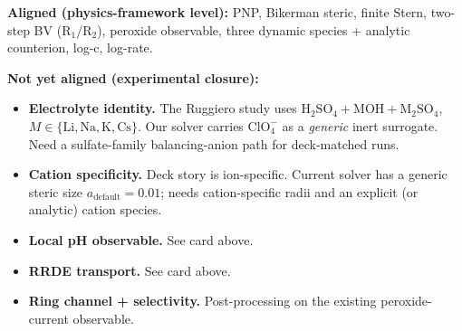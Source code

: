 \documentclass[11pt]{article}
\begin{document}
\begin{tcolorbox}[cardstyle={Where we are vs.\ deck experiment (closure list)}]
\textbf{Aligned (physics-framework level):} PNP, Bikerman steric,
finite Stern, two-step BV (R$_1$/R$_2$), peroxide observable, three
dynamic species + analytic counterion, log-c, log-rate.

\textbf{Not yet aligned (experimental closure):}

\begin{itemize}
  \item \textbf{Electrolyte identity.} The Ruggiero study uses
        \(\mathrm{H_2SO_4 + MOH + M_2SO_4}\),
        \(M\in\{\mathrm{Li,Na,K,Cs}\}\). Our solver carries
        \(\mathrm{ClO_4^-}\) as a \emph{generic} inert surrogate.
        Need a sulfate-family balancing-anion path for deck-matched runs.
  \item \textbf{Cation specificity.} Deck story is ion-specific.
        Current solver has a generic steric size
        \(a_{\mathrm{default}} = 0.01\); needs cation-specific radii
        and an explicit (or analytic) cation species.
  \item \textbf{Local pH observable.} See card above.
  \item \textbf{RRDE transport.} See card above.
  \item \textbf{Ring channel + selectivity.} Post-processing on the
        existing peroxide-current observable.
\end{itemize}
\end{tcolorbox}
\end{document}
